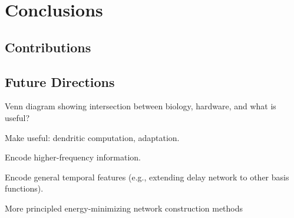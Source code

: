 \chapter{Conclusions}
\label{chapt:conclusions}

\section{Contributions}


\section{Future Directions}

Venn diagram showing intersection between biology, hardware, and what is useful?

Make useful: dendritic computation, adaptation.

Encode higher-frequency information.

Encode general temporal features (e.g., extending delay network to other basis functions).

More principled energy-minimizing network construction methods
